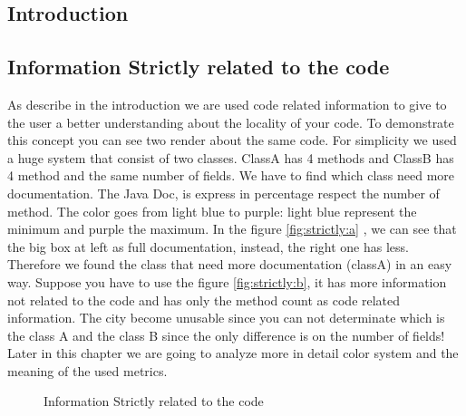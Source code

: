 \documentclass[]{usiinfbachelorproject}
\begin{document}
\subsection{Introduction}


\subsection{Information Strictly related to the code}
As describe in the introduction we are used code related information to give to the user a better understanding about the locality of your code. To demonstrate this concept you can see two render about the same code. For simplicity we used a huge system that consist of two classes. ClassA has 4 methods and ClassB has 4 method and the same number of fields. We have to find which class need more documentation. The Java Doc, is express in percentage respect the number of method. The color goes from light blue to purple: light blue represent the minimum and purple the maximum. In the figure \ref{fig:strictly:a} , we can see that the big box at left as full documentation, instead, the right one has less. Therefore we found the class that need more documentation (classA) in an easy way. Suppose you have to use the figure \ref{fig:strictly:b}, it has more information not related to the code and has only the method count as code related information. The city become unusable since you can not determinate which is the class A and the class B since the only difference is on the number of fields! Later in this chapter we are going to analyze more in detail color system and the meaning of the used metrics.
\begin{figure}[h]
\centering
{}
\hspace*{\fill}

\caption{Information Strictly related to the code}
\label{fig:strictly}

\end{figure}
\end{document}
